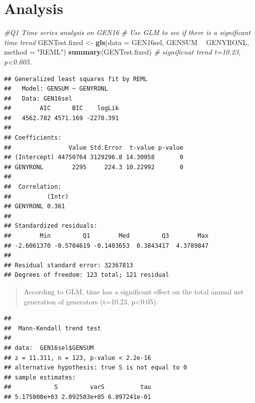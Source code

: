 \documentclass[12pt,]{article}
\newenvironment{Shaded}{\begin{snugshade}}{\end{snugshade}}
\newcommand{\KeywordTok}[1]{\textcolor[rgb]{0.13,0.29,0.53}{\textbf{#1}}}
\newcommand{\DataTypeTok}[1]{\textcolor[rgb]{0.13,0.29,0.53}{#1}}
\newcommand{\StringTok}[1]{\textcolor[rgb]{0.31,0.60,0.02}{#1}}
\newcommand{\CommentTok}[1]{\textcolor[rgb]{0.56,0.35,0.01}{\textit{#1}}}
\newcommand{\OperatorTok}[1]{\textcolor[rgb]{0.81,0.36,0.00}{\textbf{#1}}}
\newcommand{\NormalTok}[1]{#1}
\begin{document}
\newpage

\section{Analysis}\label{analysis}

\begin{Shaded}
\begin{Highlighting}[]
\CommentTok{#Q1 Time series analysis on GEN16}
\CommentTok{# Use GLM to see if there is a significant time trend}
\NormalTok{GENTest.fixed <-}\StringTok{ }\KeywordTok{gls}\NormalTok{(}\DataTypeTok{data =}\NormalTok{ GEN16sel,}
\NormalTok{                     GENSUM }\OperatorTok{~}\StringTok{ }\NormalTok{GENYRONL, }
                      \DataTypeTok{method =} \StringTok{"REML"}\NormalTok{)}
\KeywordTok{summary}\NormalTok{(GENTest.fixed) }\CommentTok{# significnat trend t=10.23, p<0.005.}
\end{Highlighting}
\end{Shaded}

\begin{verbatim}
## Generalized least squares fit by REML
##   Model: GENSUM ~ GENYRONL 
##   Data: GEN16sel 
##        AIC      BIC    logLik
##   4562.782 4571.169 -2278.391
## 
## Coefficients:
##                Value Std.Error  t-value p-value
## (Intercept) 44750764 3129296.8 14.30058       0
## GENYRONL        2295     224.3 10.22992       0
## 
##  Correlation: 
##          (Intr)
## GENYRONL 0.361 
## 
## Standardized residuals:
##        Min         Q1        Med         Q3        Max 
## -2.6061370 -0.5704619 -0.1403653  0.3843417  4.3789847 
## 
## Residual standard error: 32367813 
## Degrees of freedom: 123 total; 121 residual
\end{verbatim}

\begin{quote}
According to GLM, time has a significant effect on the total annual net
generation of generators (t=10.23, p\textless{}0.05).
\end{quote}

\begin{Shaded}
\end{Shaded}

\begin{verbatim}
## 
##  Mann-Kendall trend test
## 
## data:  GEN16sel$GENSUM
## z = 11.311, n = 123, p-value < 2.2e-16
## alternative hypothesis: true S is not equal to 0
## sample estimates:
##            S         varS          tau 
## 5.175000e+03 2.092503e+05 6.897241e-01
\end{verbatim}
\end{document}
